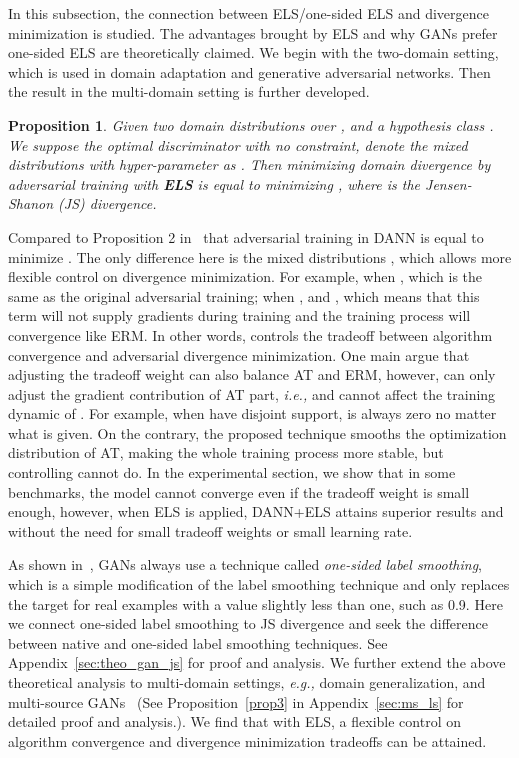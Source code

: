 \documentclass{article} \usepackage{iclr2023_conference,times}
\newtheorem{prop}{Proposition}
\newcommand{\abbr}[0]{DANN+ELS\xspace}
\newcommand{\ls}[0]{ELS\xspace}
\newcommand{\ie}[0]{\textit{i.e., }}
\newcommand{\eg}[0]{\textit{e.g., }}
\begin{document}
In this subsection, the connection between \ls/one-sided \ls and divergence minimization is studied. The advantages brought by \ls and why GANs prefer one-sided \ls are theoretically claimed. We begin with the two-domain setting, which is used in domain adaptation and generative adversarial networks. Then the result in the multi-domain setting is further developed.
\begin{prop}
Given two domain distributions  over , and a hypothesis class . We suppose  the optimal discriminator with no constraint, denote the mixed distributions with hyper-parameter  as . Then minimizing domain divergence by adversarial training with \textbf{\ls} is equal to minimizing , where  is the Jensen-Shanon (JS) divergence.
  \label{prop1}
\end{prop}
Compared to Proposition 2 in~\citep{acuna2021f} that adversarial training in DANN is equal to minimize . The only difference here is the mixed distributions , which allows more flexible control on divergence minimization. For example, when ,  which is the same as the original adversarial training; when ,  and , which means that this term will not supply gradients during training and the training process will convergence like ERM. In other words,  controls the tradeoff between algorithm convergence and adversarial divergence minimization. One main argue that adjusting the tradeoff weight  can also balance AT and ERM, however,  can only adjust the gradient contribution of AT part, \ie  and cannot affect the training dynamic of . For example, when  have disjoint support,  is always zero no matter what  is given. On the contrary, the proposed technique smooths the optimization distribution  of AT, making the whole training process more stable, but controlling  cannot do. In the experimental section, we show that in some benchmarks, the model cannot converge even if the tradeoff weight is small enough, however, when \ls is applied, \abbr attains superior results and without the need for small tradeoff weights or small learning rate.

As shown in~\citep{goodfellow2016nips}, GANs always use a technique called \textit{one-sided label smoothing}, which is a simple modification of the label smoothing technique and only replaces the target for real examples with a value slightly less than one, such as 0.9. Here we connect one-sided label smoothing to JS divergence and seek the difference between native and one-sided label smoothing techniques. See Appendix~\ref{sec:theo_gan_js} for proof and analysis. We further extend the above theoretical analysis to multi-domain settings, \eg domain generalization, and multi-source GANs~\citep{trung2019learning} (See Proposition~\ref{prop3} in Appendix~\ref{sec:ms_ls} for detailed proof and analysis.). We find that with \ls, a flexible control on algorithm convergence and divergence minimization tradeoffs can be attained.
\end{document}
